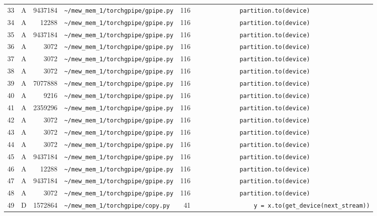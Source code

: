 \documentclass{article}
\begin{document}
\begin{longtable}{r l r p{6.5cm} r p{7.0cm}}
33 & A & 9437184 & \lstinline|~/mew_mem_1/torchgpipe/gpipe.py| & 116 & \lstinline|            partition.to(device)| \\
34 & A & 12288 & \lstinline|~/mew_mem_1/torchgpipe/gpipe.py| & 116 & \lstinline|            partition.to(device)| \\
35 & A & 9437184 & \lstinline|~/mew_mem_1/torchgpipe/gpipe.py| & 116 & \lstinline|            partition.to(device)| \\
36 & A & 3072 & \lstinline|~/mew_mem_1/torchgpipe/gpipe.py| & 116 & \lstinline|            partition.to(device)| \\
37 & A & 3072 & \lstinline|~/mew_mem_1/torchgpipe/gpipe.py| & 116 & \lstinline|            partition.to(device)| \\
38 & A & 3072 & \lstinline|~/mew_mem_1/torchgpipe/gpipe.py| & 116 & \lstinline|            partition.to(device)| \\
39 & A & 7077888 & \lstinline|~/mew_mem_1/torchgpipe/gpipe.py| & 116 & \lstinline|            partition.to(device)| \\
40 & A & 9216 & \lstinline|~/mew_mem_1/torchgpipe/gpipe.py| & 116 & \lstinline|            partition.to(device)| \\
41 & A & 2359296 & \lstinline|~/mew_mem_1/torchgpipe/gpipe.py| & 116 & \lstinline|            partition.to(device)| \\
42 & A & 3072 & \lstinline|~/mew_mem_1/torchgpipe/gpipe.py| & 116 & \lstinline|            partition.to(device)| \\
43 & A & 3072 & \lstinline|~/mew_mem_1/torchgpipe/gpipe.py| & 116 & \lstinline|            partition.to(device)| \\
44 & A & 3072 & \lstinline|~/mew_mem_1/torchgpipe/gpipe.py| & 116 & \lstinline|            partition.to(device)| \\
45 & A & 9437184 & \lstinline|~/mew_mem_1/torchgpipe/gpipe.py| & 116 & \lstinline|            partition.to(device)| \\
46 & A & 12288 & \lstinline|~/mew_mem_1/torchgpipe/gpipe.py| & 116 & \lstinline|            partition.to(device)| \\
47 & A & 9437184 & \lstinline|~/mew_mem_1/torchgpipe/gpipe.py| & 116 & \lstinline|            partition.to(device)| \\
48 & A & 3072 & \lstinline|~/mew_mem_1/torchgpipe/gpipe.py| & 116 & \lstinline|            partition.to(device)| \\
49 & D & 1572864 & \lstinline|~/mew_mem_1/torchgpipe/copy.py| & 41 & \lstinline|                y = x.to(get_device(next_stream))| \\

\end{longtable}
\end{document}
